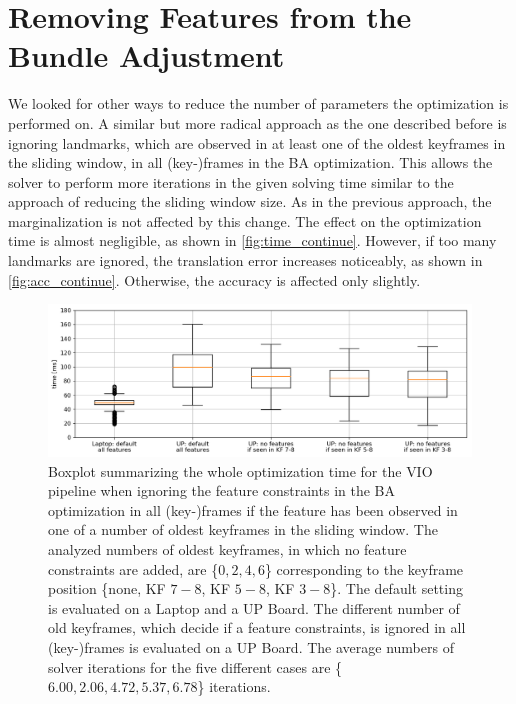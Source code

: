 \begin{minipage}[b]{1\linewidth}
\section{Removing Features from the Bundle Adjustment} \label{sec:dontOptimize}
We looked for other ways to reduce the number of parameters the optimization is 
performed on. A similar but more radical approach as the one described before 
is ignoring landmarks, which are observed in at least one of 
the oldest keyframes in the sliding window, in all (key-)frames in the \ac{BA} 
optimization. This allows the solver to perform more iterations in the given 
solving time similar to the approach of reducing the sliding window size. As in 
the previous approach, the marginalization is not affected by this change. The 
effect on the optimization time is almost negligible, as shown in 
\autoref{fig:time_continue}. However, if too many landmarks are ignored, the 
translation error increases noticeably, as shown in  
\autoref{fig:acc_continue}. Otherwise, the accuracy is affected only slightly.
\begin{figure}[H]
\centering
\includegraphics[width=1\textwidth]{images/time_continue}
\caption{Boxplot summarizing the whole optimization time for the \ac{VIO} 
pipeline when ignoring the feature constraints in the \ac{BA} optimization in 
all (key-)frames if the feature has been observed in one of a number of oldest 
keyframes in the sliding window. The analyzed numbers of oldest keyframes, in 
which no feature constraints are added, are \{$0, 2, 4, 6$\} corresponding to 
the keyframe position \{none, KF $7\!-\!8$, KF $5\!-\!8$, KF $3\!-\!8$\}. The 
default setting is evaluated on a Laptop and a UP Board. The different number 
of old keyframes, which decide if a feature constraints, is ignored in all 
(key-)frames is evaluated on a UP Board. The average numbers of solver 
iterations for the five different cases are \{$6.00, 2.06, 4.72, 5.37, 6.78$\} 
iterations.}
\label{fig:time_continue}
\end{figure}

\end{minipage}
